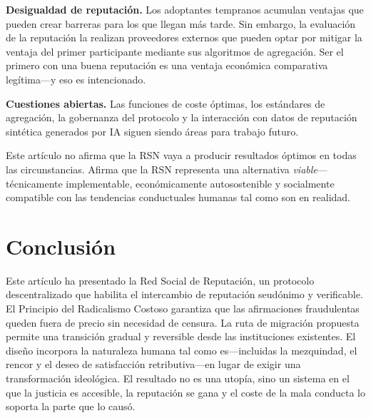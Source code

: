 \documentclass[11pt,a4paper,twocolumn]{article}
\begin{document}
\textbf{Desigualdad de reputación.} Los adoptantes tempranos acumulan ventajas que pueden crear barreras para los que llegan más tarde. Sin embargo, la evaluación de la reputación la realizan proveedores externos que pueden optar por mitigar la ventaja del primer participante mediante sus algoritmos de agregación. Ser el primero con una buena reputación es una ventaja económica comparativa legítima---y eso es intencionado.

\textbf{Cuestiones abiertas.} Las funciones de coste óptimas, los estándares de agregación, la gobernanza del protocolo y la interacción con datos de reputación sintética generados por IA siguen siendo áreas para trabajo futuro.

Este artículo no afirma que la RSN vaya a producir resultados óptimos en todas las circunstancias. Afirma que la RSN representa una alternativa \emph{viable}---técnicamente implementable, económicamente autosostenible y socialmente compatible con las tendencias conductuales humanas tal como son en realidad.

\section{Conclusión}

Este artículo ha presentado la Red Social de Reputación, un protocolo descentralizado que habilita el intercambio de reputación seudónimo y verificable. El Principio del Radicalismo Costoso garantiza que las afirmaciones fraudulentas queden fuera de precio sin necesidad de censura. La ruta de migración propuesta permite una transición gradual y reversible desde las instituciones existentes. El diseño incorpora la naturaleza humana tal como es---incluidas la mezquindad, el rencor y el deseo de satisfacción retributiva---en lugar de exigir una transformación ideológica. El resultado no es una utopía, sino un sistema en el que la justicia es accesible, la reputación se gana y el coste de la mala conducta lo soporta la parte que lo causó.


\end{document}
